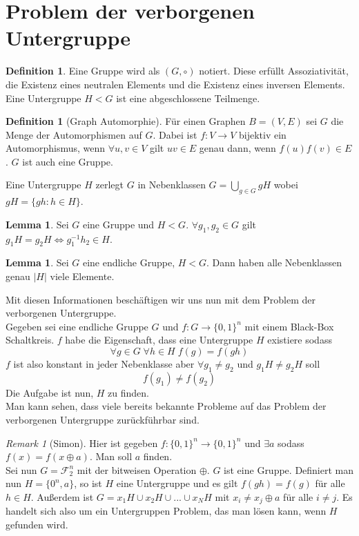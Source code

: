 \documentclass[a4paper, 12pt]{article}
\theoremstyle{plain}
\theoremstyle{definition}
\newtheorem{definition}[theorem]{Definition} %
\theoremstyle{lemma}
\newtheorem{lemma}[theorem]{Lemma}
\theoremstyle{remark}
\newtheorem{remark}[theorem]{Remark}
\theoremstyle{example}
\begin{document}
	\section{Problem der verborgenen Untergruppe}
	\begin{definition}
		Eine Gruppe wird als $(G,\circ)$ notiert. Diese erfüllt Assoziativität, die Existenz eines neutralen Elements und die Existenz eines inversen Elements. Eine Untergruppe $H<G$ ist eine abgeschlossene Teilmenge.
	\end{definition}
	\begin{definition}[Graph Automorphie]
		Für einen Graphen $B = (V,E)$ sei $G$ die Menge der Automorphismen auf $G$. Dabei ist $f: V \to V$ bijektiv ein Automorphismus, wenn $\forall u,v \in V$ gilt $uv \in E$ genau dann, wenn $f(u)f(v) \in E$. $G$ ist auch eine Gruppe.
	\end{definition}
	\noindent Eine Untergruppe $H$ zerlegt $G$ in Nebenklassen $G = \bigcup_{g \in G} gH$ wobei $gH = \{gh : h \in H\}$.
	\begin{lemma}
		Sei $G$ eine Gruppe und $H<G$. $\forall g_1,g_2 \in G$ gilt $g_1H = g_2H \Leftrightarrow g_1^{-1}h_2 \in H$.
	\end{lemma}
	\begin{lemma}
		Sei $G$ eine endliche Gruppe, $H<G$. Dann haben alle Nebenklassen genau $\left|H\right|$ viele Elemente.
	\end{lemma}
	Mit diesen Informationen beschäftigen wir uns nun mit dem Problem der verborgenen Untergruppe.\\
	Gegeben sei eine endliche Gruppe $G$ und $f:G \to \{0,1\}^n$ mit einem Black-Box Schaltkreis. $f$ habe die Eigenschaft, dass eine Untergruppe $H$ existiere sodass \[\forall g \in G\; \forall h \in H\; f(g) = f(gh)\] $f$ ist also konstant in jeder Nebenklasse aber $\forall g_1 \neq g_2$ und $g_1H \neq g_2H$ soll \[f(g_1) \neq f(g_2)\] Die Aufgabe ist nun, $H$ zu finden.\\
	Man kann sehen, dass viele bereits bekannte Probleme auf das Problem der verborgenen Untergruppe zurückführbar sind.
	\begin{remark}[Simon]
		Hier ist gegeben $f:\{0,1\}^n \to \{0,1\}^n$ und $\exists a$ sodass $f(x) = f(x\oplus a)$. Man soll $a$ finden.\\
		Sei nun $G = \mathcal{F}_2^n$ mit der bitweisen Operation $\oplus$. $G$ ist eine Gruppe. Definiert man nun $H = \{0^n,a\}$, so ist $H$ eine Untergruppe und es gilt $f(gh) = f(g)$ für alle $h \in H$. Außerdem ist $G = x_1H \cup x_2H \cup ... \cup x_NH$ mit $x_i \neq x_j \oplus a$ für alle $i \neq j$. Es handelt sich also um ein Untergruppen Problem, das man lösen kann, wenn $H$ gefunden wird.
	\end{remark}
\end{document}

